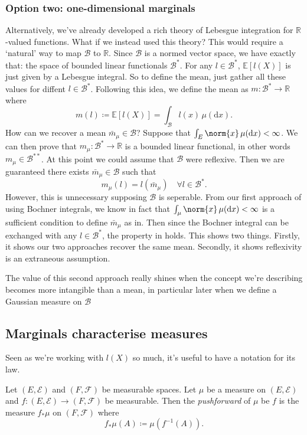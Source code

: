 \documentclass[fontsize=12pt, DIV=12]{scrreprt}
\newcommand{\defeq}{\coloneqq}
\newcommand{\R}{\mathbb R}
\newcommand{\E}{\mathbb E}
\newcommand{\calB}{\mathcal B}
\newcommand{\calE}{\mathcal E}
\newcommand{\calF}{\mathcal F}
\newcommand{\dif}[1]{\text{d} #1}
\begin{document}
\subsubsection{Option two: one-dimensional marginals}

Alternatively, we've already developed a rich theory of Lebesgue integration for $\R$-valued functions. What if we instead used this theory? This would require a `natural' way to map $\calB$ to $\R$. Since $\calB$ is a normed vector space, we have exactly that: the space of bounded linear functionals $\calB^*$. For any $l \in \calB^*$, $\E[l(X)]$ is just given by a Lebesgue integral. So to define the mean, just gather all these values for diffent $l \in \calB^*$. Following this idea, we define the mean as $m: \calB^* \to \R$ where
\begin{equation}
	m(l) \defeq \E[l(X)] = \int_{\calB} l(x) \, \mu(\dif x).
\end{equation}
How can we recover a mean $\bar{m}_{\mu} \in \calB$? Suppose that $\int_E \norm{x} \, \mu(\dif x) < \infty$. We can then prove that $m_{\mu}: \calB^* \to \R$ is a bounded linear functional, in other words $m_{\mu} \in \calB^{**}$. At this point we could assume that $\calB$ were reflexive. Then we are guaranteed there exists $\bar{m}_{\mu} \in \calB$ such that
\begin{equation}
	m_{\mu}(l) = l(\bar{m}_{\mu}) \quad \forall l \in \calB^*.
\end{equation}
However, this is unnecessary supposing $\calB$ is seperable. From our first approach of using Bochner integrals, we know in fact that $\int_{\mu} \norm{x} \, \mu(\dif x) < \infty$ is a sufficient condition to define $\bar{m}_{\mu}$ as in. Then since the Bochner integral can be exchanged with any $l \in \calB^*$, the property in holds. This shows two things. Firstly, it shows our two approaches recover the same mean. Secondly, it shows reflexivity is an extraneous assumption.

The value of this second approach really shines when the concept we're describing becomes more intangible than a mean, in particular later when we define a Gaussian measure on $\calB$

\subsection{Marginals characterise measures}

Seen as we're working with $l(X)$ so much, it's useful to have a notation for its law.
\begin{defn}
	Let $(E, \calE)$ and $(F, \calF)$ be measurable spaces. Let $\mu$ be a measure on $(E, \calE)$ and $f: (E, \calE) \to (F, \calF)$ be measurable. Then the \emph{pushforward} of $\mu$ be $f$ is the measure $f_* \mu$ on $(F, \calF)$ where
	\begin{equation}
		f_* \mu(A) \defeq \mu(f^{-1}(A)).
	\end{equation}
\end{defn}
\end{document}
